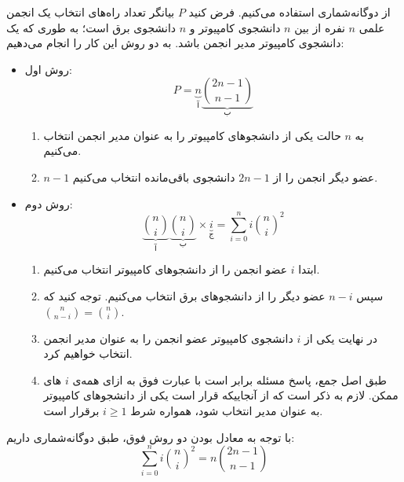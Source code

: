         \p
        از دوگانه‌شماری استفاده می‌کنیم.
        فرض کنید
        $P$
        بیانگر تعداد راه‌های انتخاب یک انجمن علمی
        $n$
        نفره از بین
        $n$
        دانشجوی کامپیوتر و 
        $n$
        دانشجوی برق است؛ 
        به طوری که یک دانشجوی کامپیوتر مدیر انجمن ‌باشد.
        به دو روش این کار را انجام می‌دهیم:
        \begin{itemize}
        \item 
        روش اول:
        $$P = \underbrace{n}_{\text{آ}} \underbrace{\binom{2n-1}{n-1}}_{\text{ب}}$$
        \begin{enumerate}
        \item 
        به 
        $n$
        حالت 
        یکی از دانشجو‌های کامپیوتر را به عنوان مدیر انجمن انتخاب می‌کنیم.
        \item  
        $n-1$
        عضو دیگر انجمن را از
        $2n-1$
        دانشجوی باقی‌مانده انتخاب می‌کنیم.
       
        \end{enumerate}
        \item
        روش دوم:
        $$\underbrace{\binom{n}{i}}_{\text{آ}} \underbrace{\binom{n}{i}}_{\text{ب}} \times \underbrace{i}_{\text{ج}}  =\sum\limits_{i=0}^{n} i {\binom{n}{i}}^2$$
        \begin{enumerate}             
        \item 
        ابتدا 
        $i$
        عضو انجمن را از دانشجو‌های کامپیوتر 
        انتخاب می‌کنیم.
        \item 
        سپس
        $n-i$
        عضو دیگر را از دانشجو‌های برق انتخاب می‌کنیم.
       توجه کنید که 
    $\binom{n}{n-i} = \binom{n}{i}$.
        \item 
        در نهایت یکی از
        $i$
        دانشجوی کامپیوتر عضو انجمن را به عنوان مدیر انجمن انتخاب خواهیم کرد.
        \item
        طبق اصل جمع،
        پاسخ مسئله برابر است با عبارت فوق 
         به ازای همه‌ی 
         $i$
         های ممکن.   
         لازم به ذکر است که از آنجاییکه  قرار است یکی از دانشجو‌های کامپیوتر به عنوان مدیر انتخاب شود، همواره شرط
         $i\geq 1$
         برقرار است. 
        \end{enumerate}
        \end{itemize} 
       
        \p
        با توجه به معادل بودن دو روش فوق، طبق دوگانه‌شماری داریم:
        $$ \sum\limits_{i=0}^{n} i {\binom{n}{i}}^2 = n\binom{2n-1}{n-1}$$